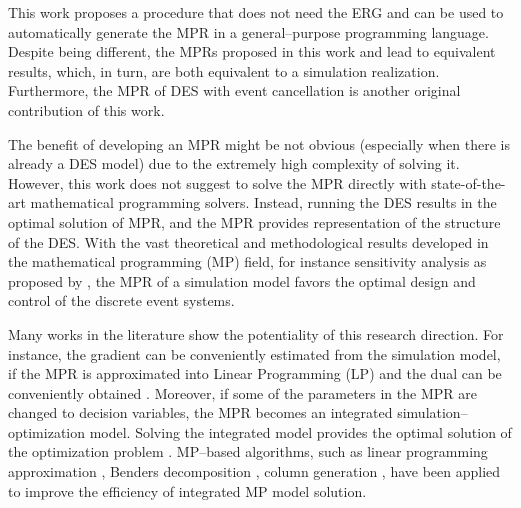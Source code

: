 \documentclass[]{interact}
\theoremstyle{plain}%
\theoremstyle{definition}
\theoremstyle{remark}
\begin{document}
This work proposes a procedure that does not need %
the ERG and %
can be used to automatically generate the MPR in a general--purpose programming language. Despite %
being different, the MPRs proposed in this work and \cite{chan2008optimization} lead to %
equivalent results, which, in turn, are both equivalent to a simulation realization. Furthermore, the MPR of DES with event cancellation is another original contribution of this work. 

The benefit of developing an MPR might be not obvious (especially when there is already a DES model) due to the extremely high complexity of solving it. 
However, this work does not suggest to solve the MPR directly with state-of-the-art mathematical programming solvers. Instead, running the DES results in the optimal solution of MPR, and the MPR provides representation of the structure of the DES. With the vast theoretical and methodological results developed in the mathematical programming (MP) field, for instance sensitivity analysis as proposed by \cite{chan2008optimization}, the MPR of a simulation model favors the optimal design and control of the discrete event systems. 


Many works in the literature show the potentiality of this research direction. For instance, the gradient can be conveniently estimated from the simulation model, if the MPR is approximated into Linear Programming (LP) and %
the dual can be conveniently obtained \citep{chan2008optimization, zhang2020simulation}. Moreover, if some of the parameters in the MPR are changed to decision variables, the MPR becomes an integrated simulation--optimization model. Solving the integrated model provides the optimal solution of the optimization problem \citep{matta2008simulation}. MP--based algorithms, such as linear programming approximation \citep{alfieri2012mathematical}, Benders decomposition \citep{weiss2015buffer}, column generation \citep{alfieri2020time}, have been applied to improve the efficiency of %
integrated MP model solution. 
\end{document}
